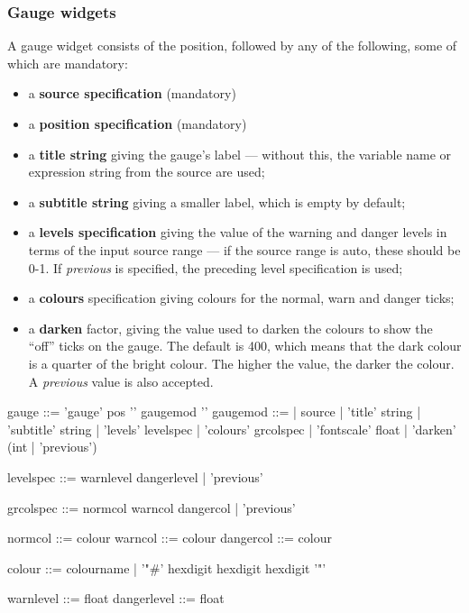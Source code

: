 \subsubsection{Gauge widgets}
A gauge widget consists of the position, followed by any of the following,
some of which are mandatory:
\begin{itemize}
\item a \textbf{source specification} (mandatory)
\item a \textbf{position specification} (mandatory)
\item a \textbf{title string} giving the gauge's label --- without this,
the variable name or expression string from the source are used;
\item a \textbf{subtitle string} giving a smaller label, which is empty
by default;
\item a \textbf{levels specification} giving the value of the warning
and danger levels in terms of the input source range --- if the source range is
auto, these should be 0-1. If \emph{previous} is specified, the preceding
level specification is used;
\item a \textbf{colours} specification giving colours for 
the normal, warn and danger ticks;
\item a \textbf{darken} factor, giving the value used to darken the colours
to show the ``off'' ticks on the gauge. The default is 400, which means that
the dark colour is a quarter of the bright colour. The higher the value, 
the darker the colour. A \emph{previous} value is also accepted.
\end{itemize}
\begin{v}
gauge       ::= 'gauge' pos '{' { gaugemod } '}'
gaugemod    ::=
            |   source
            |   'title' string
            |   'subtitle' string
            |   'levels' levelspec
            |   'colours' grcolspec
            |   'fontscale' float
            |   'darken' (int | 'previous')

levelspec   ::= warnlevel dangerlevel
            |   'previous'
            
grcolspec   ::= normcol warncol dangercol
            |   'previous'
            
normcol     ::= colour
warncol     ::= colour
dangercol   ::= colour

colour      ::= colourname
            |   '"#' hexdigit hexdigit hexdigit '"'

warnlevel   ::= float            
dangerlevel ::= float            
\end{v}

